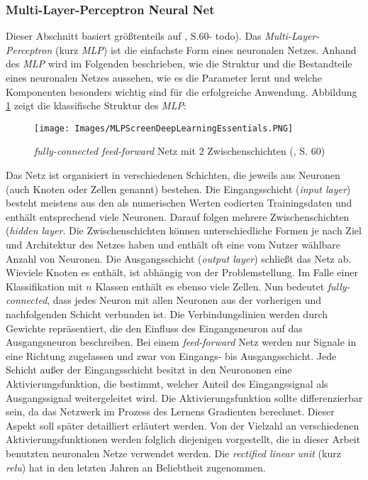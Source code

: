 \documentclass[a4paper,11pt]{article}
\begin{document}
\subsubsection{Multi-Layer-Perceptron Neural Net}

Dieser Abschnitt basiert größtenteils auf \cite{deepEssentials}, S.60- todo).
Das \textit{Multi-Layer-Perceptron} (kurz \textit{MLP}) ist die einfachste Form eines neuronalen Netzes. Anhand des \textit{MLP} wird im Folgenden beschrieben, wie die Struktur und die Bestandteile eines neuronalen Netzes aussehen, wie es die Parameter lernt und welche Komponenten besonders wichtig sind für die erfolgreiche Anwendung. Abbildung \ref{abb:MLPScreen} zeigt die klassifische Struktur des \textit{MLP}:


\begin{figure}[!ht]
\begin{center}
\texttt{[image: Images/MLPScreenDeepLearningEssentials.PNG]}
\label{abb:MLPScreen}
\caption{\textit{fully-connected feed-forward} Netz mit 2 Zwischenschichten  (\cite{deepEssentials}, S. 60) }
\end{center}
\end{figure}

Das Netz ist organisiert in verschiedenen Schichten, die jeweils aus Neuronen (auch Knoten oder Zellen genannt) bestehen. Die Eingangsschicht (\textit{input layer}) besteht meistens aus den als numerischen Werten codierten Trainingsdaten und enthält entsprechend viele Neuronen. Darauf folgen mehrere Zwischenschichten (\textit{hidden layer}. Die Zwischenschichten können unterschiedliche Formen je nach Ziel und Architektur des Netzes haben und enthält oft eine vom Nutzer wählbare Anzahl von Neuronen. Die Ausgangsschicht (\textit{output layer}) schließt das Netz ab. Wieviele Knoten es enthält, ist abhängig von der Problemstellung. Im Falle einer Klassifikation mit $n$ Klassen enthält es ebenso viele Zellen. Nun bedeutet \textit{fully-connected}, dass jedes Neuron mit allen Neuronen aus der vorherigen und nachfolgenden Schicht verbunden ist. Die Verbindungslinien werden durch Gewichte repräsentiert, die den Einfluss des Eingangsneuron auf das Ausgangsneuron beschreiben. Bei einem \textit{feed-forward} Netz werden nur Signale in eine Richtung  zugelassen und zwar von Eingangs- bis Ausgangsschicht. Jede Schicht außer der Eingangsschicht besitzt in den Neurononen eine Aktivierungsfunktion, die bestimmt, welcher Anteil des Eingangssignal als Ausgangssignal weitergeleitet wird. Die Aktivierungsfunktion sollte differenzierbar sein, da das Netzwerk im Prozess des Lernens Gradienten berechnet. Dieser Aspekt soll später detailliert erläutert werden. Von der Vielzahl an verschiedenen Aktivierungsfunktionen werden folglich diejenigen vorgestellt, die in dieser Arbeit benutzten neuronalen Netze verwendet werden. Die \textit{rectified linear unit} (kurz \textit{relu}) hat in den letzten Jahren an Beliebtheit zugenommen.
\end{document}
